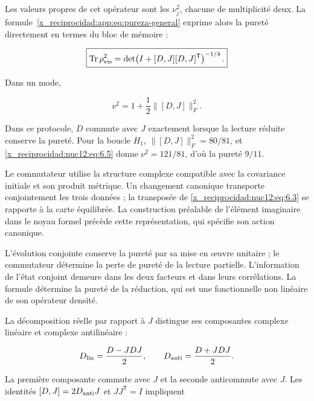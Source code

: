 Les valeurs propres de cet opérateur sont les \(\nu_j^2\), chacune de multiplicité deux. La formule~\eqref{x_reciprocidad:app:eq:pureza-general} exprime alors la pureté directement en termes du bloc de mémoire :



\begin{equation}
\boxed{\operatorname{Tr}\rho_{\rm vis}^2
=\det\!\left(I+[D,J][D,J]^{\mathsf T}\right)^{-1/4}.}
\label{x_reciprocidad:nuc12:eq:6.4}
\end{equation}



Dans un mode,



\begin{equation}
\nu^2=1+\frac12\|[D,J]\|_F^2.
\label{x_reciprocidad:nuc12:eq:6.5}
\end{equation}



Dans ce protocole, \(D\) commute avec \(J\) exactement lorsque la lecture réduite conserve la pureté. Pour la boucle \(H_1\), \(\|[D,J]\|_F^2=80/81\), et \eqref{x_reciprocidad:nuc12:eq:6.5} donne \(\nu^2=121/81\), d’où la pureté \(9/11\).

Le commutateur utilise la structure complexe compatible avec la covariance initiale et son produit métrique. Un changement canonique transporte conjointement les trois données ; la transposée de \eqref{x_reciprocidad:nuc12:eq:6.3} se rapporte à la carte équilibrée. La construction préalable de l’élément imaginaire dans le noyau formel précède cette représentation, qui spécifie son action canonique.

L’évolution conjointe conserve la pureté par sa mise en œuvre unitaire ; le commutateur détermine la perte de pureté de la lecture partielle. L’information de l’état conjoint demeure dans les deux facteurs et dans leurs corrélations. La formule détermine la pureté de la réduction, qui est une fonctionnelle non linéaire de son opérateur densité.

La décomposition réelle par rapport à \(J\) distingue ses composantes complexe linéaire et complexe antilinéaire :



\[
D_{\rm lin}=\frac{D-JDJ}{2},\qquad
D_{\rm anti}=\frac{D+JDJ}{2}.
\]



La première composante commute avec \(J\) et la seconde anticommute avec \(J\). Les identités
\([D,J]=2D_{\rm anti}J\) et \(JJ^{\mathsf T}=I\) impliquent



